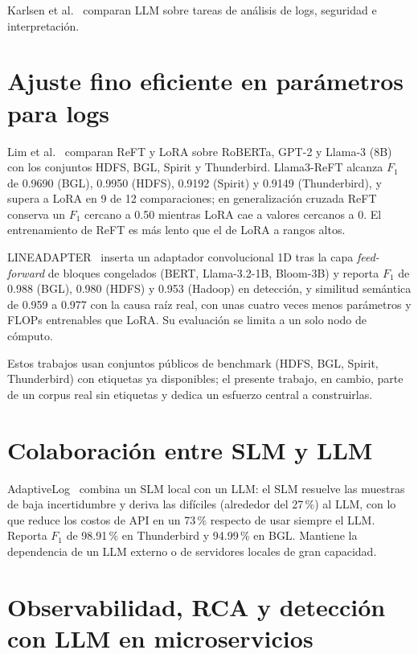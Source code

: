 Karlsen et al.~\cite{karlsen2024_benchmark} comparan LLM sobre tareas de análisis de logs, seguridad e interpretación. %

\section{Ajuste fino eficiente en parámetros para logs}\label{sec:tr_peft}

Lim et al.~\cite{lim2025_logadreft} comparan ReFT y LoRA sobre RoBERTa, GPT-2 y Llama-3 (8B) con los conjuntos HDFS, BGL, Spirit y Thunderbird. Llama3-ReFT alcanza $F_1$ de 0.9690 (BGL), 0.9950 (HDFS), 0.9192 (Spirit) y 0.9149 (Thunderbird), y supera a LoRA en 9 de 12 comparaciones; en generalización cruzada ReFT conserva un $F_1$ cercano a 0.50 mientras LoRA cae a valores cercanos a 0. El entrenamiento de ReFT es más lento que el de LoRA a rangos altos.

LINEADAPTER~\cite{liu2025_lineadapter} inserta un adaptador convolucional 1D tras la capa \textit{feed-forward} de bloques congelados (BERT, Llama-3.2-1B, Bloom-3B) y reporta $F_1$ de 0.988 (BGL), 0.980 (HDFS) y 0.953 (Hadoop) en detección, y similitud semántica de 0.959 a 0.977 con la causa raíz real, con unas cuatro veces menos parámetros y FLOPs entrenables que LoRA. Su evaluación se limita a un solo nodo de cómputo.

Estos trabajos usan conjuntos públicos de benchmark (HDFS, BGL, Spirit, Thunderbird) con etiquetas ya disponibles; el presente trabajo, en cambio, parte de un corpus real sin etiquetas y dedica un esfuerzo central a construirlas.

\section{Colaboración entre SLM y LLM}\label{sec:tr_colaboracion}

AdaptiveLog~\cite{ma2026_adaptivelog} combina un SLM local con un LLM: el SLM resuelve las muestras de baja incertidumbre y deriva las difíciles (alrededor del 27\,\%) al LLM, con lo que reduce los costos de API en un 73\,\% respecto de usar siempre el LLM. Reporta $F_1$ de 98.91\,\% en Thunderbird y 94.99\,\% en BGL. Mantiene la dependencia de un LLM externo o de servidores locales de gran capacidad.

\section{Observabilidad, RCA y detección con LLM en microservicios}\label{sec:tr_observabilidad}

